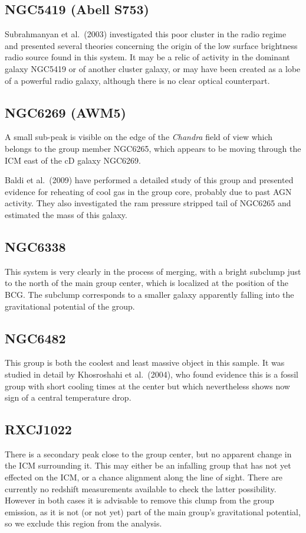 \documentclass[structabstract]{aa}
\begin{document}
 \subsection*{NGC5419 (Abell S753)}
Subrahmanyan et al.\ (2003) investigated this poor cluster in the radio regime
and presented several theories concerning the origin of the low surface
brightness radio source found in this system. It may be a relic of activity in
the dominant galaxy NGC5419 or of another cluster galaxy, or may have
been created as a lobe of a powerful radio galaxy, although there is no clear
optical counterpart.
 \subsection*{NGC6269 (AWM5)}
A small sub-peak is visible on the edge of the \emph{Chandra} field of view
which belongs to the group member NGC6265, which appears to be moving through
the ICM east of the cD galaxy NGC6269.

Baldi et al.\ (2009) have performed a detailed study of this group and
presented evidence for reheating of cool gas in the group core, probably due
to past AGN activity. They also investigated the ram pressure stripped tail of
NGC6265 and estimated the mass of this galaxy.
 \subsection*{NGC6338}
This system is very clearly in the process of merging, with a bright subclump just
to the north of the main group center, which is localized at the position of
the BCG. The subclump corresponds to a smaller galaxy apparently falling into
the gravitational potential of the group.
 \subsection*{NGC6482}
This group is both the coolest and least massive object in this sample. It was
studied in detail by Khosroshahi et al.\ (2004), who found evidence this is a
fossil group with short cooling times at the center but which nevertheless
shows now sign of a central temperature drop.
 \subsection*{RXCJ1022}
There is a secondary peak close to the group center, but no apparent change in
the ICM surrounding it. This may either be an infalling group that has not yet
effected on the ICM, or a chance alignment along the line of sight. There are
currently no redshift measurements available to check the latter
possibility. However in both cases it is advisable to remove this clump from
the group emission, as it is not (or not yet) part of the main group's
gravitational potential, so we exclude this region from the analysis.
\end{document}
